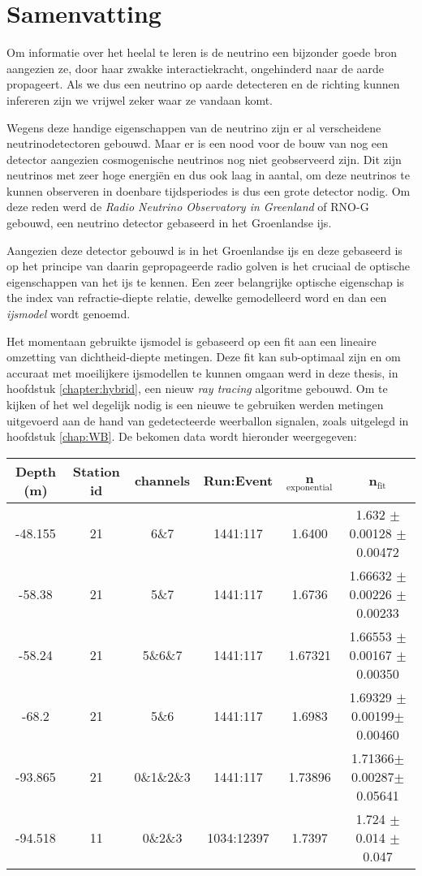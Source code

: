\chapter*{Samenvatting}
Om informatie over het heelal te leren is de neutrino een bijzonder goede bron aangezien
ze, door haar zwakke interactiekracht, ongehinderd naar de aarde propageert.
Als we dus een neutrino op aarde detecteren en de richting kunnen infereren zijn we
vrijwel zeker waar ze vandaan komt.

Wegens deze handige eigenschappen van de neutrino zijn er al verscheidene neutrinodetectoren gebouwd.
Maar er is een nood voor de bouw van nog een detector aangezien cosmogenische neutrinos nog niet
geobserveerd zijn. Dit zijn neutrinos met zeer hoge energiën en dus ook laag in aantal,
om deze neutrinos te kunnen observeren in doenbare tijdsperiodes is dus een grote detector nodig.
Om deze reden werd de \textit{Radio Neutrino Observatory in Greenland} of RNO-G gebouwd, een 
neutrino detector gebaseerd in het Groenlandse ijs.

Aangezien deze detector gebouwd is in het Groenlandse ijs en deze gebaseerd is
op het principe van daarin gepropageerde radio golven is het cruciaal de
optische eigenschappen van het ijs te kennen. Een zeer belangrijke optische
eigenschap is the index van refractie-diepte relatie, dewelke gemodelleerd word
en dan een \textit{ijsmodel} wordt genoemd.

Het momentaan gebruikte ijsmodel is gebaseerd op een fit aan een lineaire omzetting van dichtheid-diepte metingen.
Deze fit kan sub-optimaal zijn en om accuraat met moeilijkere ijsmodellen
te kunnen omgaan werd in deze thesis, in hoofdstuk \ref{chapter:hybrid}, een nieuw \textit{ray tracing}
algoritme gebouwd. Om te kijken of het wel degelijk nodig is een nieuwe te gebruiken werden 
metingen uitgevoerd aan de hand van gedetecteerde weerballon signalen, zoals uitgelegd in hoofdstuk \ref{chap:WB}. 
De bekomen data wordt hieronder weergegeven:
\begin{center}
\begin{tabular}{||c c c c c c||}
 \hline
 Depth (m) & Station id & channels & Run:Event & n$_\text{exponential}$ & n$_\text{fit}$\\ [0.5ex]
 \hline\hline
 -48.155 & 21 & 6\&7 & 1441:117 & 1.6400 & 1.632 $\pm$ 0.00128 $\pm$ 0.00472\\
 -58.38 & 21 & 5\&7 & 1441:117 & 1.6736 & 1.66632 $\pm$ 0.00226 $\pm$ 0.00233 \\
 -58.24 & 21 & 5\&6\&7 & 1441:117 & 1.67321 & 1.66553 $\pm$ 0.00167 $\pm$ 0.00350 \\
 -68.2 & 21 & 5\&6 & 1441:117 & 1.6983 & 1.69329 $\pm$0.00199$\pm$0.00460 \\
 -93.865 & 21 & 0\&1\&2\&3 & 1441:117 & 1.73896 & 1.71366$\pm$0.00287$\pm$0.05641\\
 -94.518 & 11 & 0\&2\&3 & 1034:12397 & 1.7397 & 1.724 $\pm$ 0.014 $\pm$ 0.047 \\
 \hline
\end{tabular}
\end{center}

\newpage
{\hypersetup{hidelinks}\tableofcontents} %
\newpage


